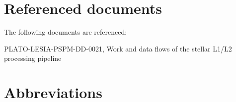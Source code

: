 \documentclass[a4paper, oneside, 11pt, article, english]{memoir}
\begin{document}
\section{Referenced documents}
\label{sec:docs}


The following documents are referenced:

\begin{description}
  \firmlist
\item[RD1] PLATO-LESIA-PSPM-DD-0021, Work and data flows of the stellar L1/L2 processing pipeline
\end{description}


\section{Abbreviations}
\label{sec:abbrev}

\end{document}
